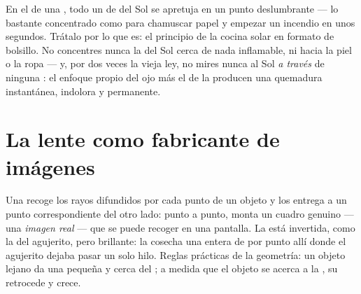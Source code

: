 \begin{remark}\label{rem:g8:lenses-images:burning}
En el  de una , todo un  de 
del Sol se apretuja en un punto deslumbrante --- lo bastante
concentrado como para chamuscar papel y empezar un incendio en unos
segundos. Trátalo por lo que es: el principio de la cocina solar en
formato de bolsillo. No concentres nunca la  del Sol cerca de nada
inflamable, ni hacia la piel o la ropa --- y, por dos veces la vieja
ley, no mires nunca al Sol \emph{a través} de ninguna
: el enfoque propio del ojo más el de la 
producen una quemadura instantánea, indolora y permanente.
\end{remark}

\section{La lente como fabricante de imágenes}

\begin{proposition}\label{prop:g8:lenses-images:realimage}
Una  recoge los rayos difundidos por cada punto
de un objeto y los entrega a un punto correspondiente del otro lado:
punto a punto, monta un cuadro genuino --- una \emph{imagen
real} --- que se puede recoger en una pantalla. La
 está invertida, como la del agujerito, pero brillante: la
 cosecha una  entera de  por punto allí
donde el agujerito dejaba pasar un solo hilo. Reglas prácticas de la
geometría: un objeto lejano da una  pequeña y cerca del
; a medida que el objeto se acerca a la , su
 retrocede y crece.
\end{proposition}

